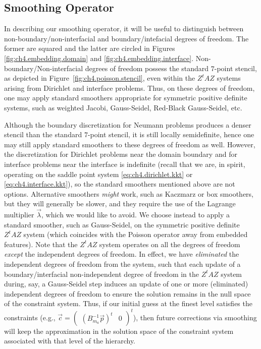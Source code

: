 \subsection{Smoothing Operator} \label{subsec:ch4.multigrid.smoothing}

In describing our smoothing operator, it will be useful to distinguish between non-boundary/non-interfacial and boundary/intefacial degrees of freedom. The former are squared and the latter are circled in Figures \ref{fig:ch4.embedding.domain} and \ref{fig:ch4.embedding.interface}. Non-boundary/Non-interfacial degrees of freedom possess the standard $7$-point stencil, as depicted in Figure~\ref{fig:ch4.poisson.stencil}, even within the $Z^tAZ$ systems arising from Dirichlet and interface problems. Thus, on these degrees of freedom, one may apply standard smoothers appropriate for symmetric positive definite systems, such as weighted Jacobi, Gauss-Seidel, Red-Black Gauss-Seidel, etc.

Although the boundary discretization for Neumann problems produces a denser stencil than the standard $7$-point stencil, it is still locally semidefinite, hence one may still apply standard smoothers to these degrees of freedom as well. However, the discretization for Dirichlet problems near the domain boundary and for interface problems near the interface is indefinite (recall that we are, in spirit, operating on the saddle point system \eqref{eq:ch4.dirichlet.kkt} or \eqref{eq:ch4.interface.kkt}), so the standard smoothers mentioned above are not options. Alternative smoothers \emph{might} work, such as Kaczmarz or box smoothers, but they will generally be slower, and they require the use of the Lagrange multiplier $\vec{\lambda}$, which we would like to avoid. We choose instead to apply a standard smoother, such as Gauss-Seidel, on the symmetric positive definite $Z^tAZ$ system (which coincides with the Poisson operator away from embedded features). Note that the $Z^tAZ$ system operates on all the degrees of freedom \emph{except} the independent degrees of freedom. In effect, we have \emph{eliminated} the independent degrees of freedom from the system, such that each update of a boundary/interfacial non-independent degree of freedom in the $Z^tAZ$ system during, say, a Gauss-Seidel step induces an update of one or more (eliminated) independent degrees of freedom to ensure the solution remains in the null space of the constraint system. Thus, if our initial guess at the finest level satisfies the constraints (e.g., $\vec{c} = \begin{pmatrix} (B_{m_a}^{-1} \vec{p})^t & 0 \end{pmatrix}^t$), then future corrections via smoothing will keep the approximation in the solution space of the constraint system associated with that level of the hierarchy.

